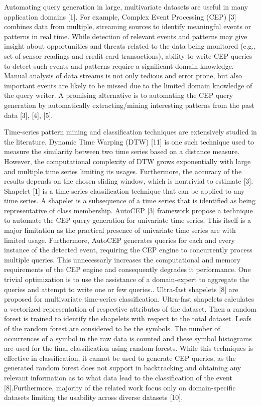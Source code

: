 \documentclass[letterpaper, 10 pt, conference]{IEEEtran}  %
\begin{document}
Automating query generation in large, multivariate datasets are useful in many application domains [1]. For example, Complex Event Processing (CEP) [3] combines data from multiple, streaming sources to identify meaningful events or patterns in real time. While detection of relevant events and patterns may give insight about opportunities and threats related to the data being monitored (e.g., set of sensor readings and credit card transactions), ability to write CEP queries to detect such events and patterns require a significant domain knowledge. Manual analysis of data streams is not only tedious and error prone, but also important events are likely to be missed due to the limited domain knowledge of the query writer. A promising alternative is to automating the CEP query generation by automatically extracting/mining interesting patterns from the past data [3], [4], [5].

Time-series pattern mining and classification techniques are extensively studied in the literature. Dynamic Time Warping (DTW) [11] is one such technique used to measure the similarity between two time series based on a distance measure. However, the computational complexity of DTW grows exponentially with large and multiple time series limiting its usages. Furthermore, the accuracy of the results depends on the chosen sliding window, which is nontrivial to estimate [3]. Shapelet [1] is a time-series classification technique that can be applied to any time series. A shapelet is a subsequence of a time series that is identified as being representative of class membership. AutoCEP [3] framework propose a technique to automate the CEP query generation for univariate time series. This itself is a major limitation as the practical presence of univariate time series are with limited usage. Furthermore, AutoCEP generates queries for each and every instance of the detected event, requiring the CEP engine to concurrently process multiple queries. This unnecessarly increases the computational and memory requirements of the CEP engine and consequently degrades it performance. One trivial optimization is to use the assistance of a domain-expert to aggregate the queries and attempt to write one or few queries.. Ultra-fast shapelets [8] are proposed for multivariate time-series classification. Ultra-fast shapelets calculates a vectorized representation of respective attributes of the dataset. Then a random forest is trained to identify the shapelets with respect to the total dataset. Leafs of the random forest are considered to be the symbols. The number of occurrences of a symbol in the raw data is counted and these symbol histograms are used for the final classification using random forests. While this techniques is effective in classification, it cannot be used to generate CEP queries, as the generated random forest does not support in backtracking and obtaining any relevant information as to what data lead to the classification of the event [8].Furthermore, majority of the related work focus only on domain-specific datasets limiting the usability across diverse datasets [10].
\end{document}
